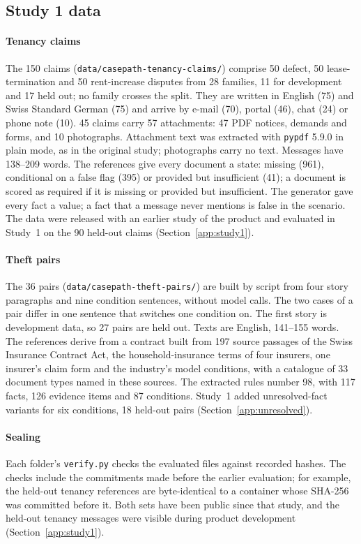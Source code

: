 \documentclass[acmsmall,screen,nonacm]{acmart}
\begin{document}
\subsection{Study 1 data}
\label{app:data-s1}

\paragraph{Tenancy claims}
The 150 claims (\texttt{data/\allowbreak{}casepath-tenancy-claims/}) comprise 50 defect, 50 lease-termination and 50 rent-increase disputes from 28 families, 11 for development and 17 held out; no family crosses the split. They are written in English (75) and Swiss Standard German (75) and arrive by e-mail (70), portal (46), chat (24) or phone note (10). 45 claims carry 57 attachments: 47 PDF notices, demands and forms, and 10 photographs. Attachment text was extracted with \texttt{pypdf} 5.9.0 in plain mode, as in the original study; photographs carry no text. Messages have 138--209 words. The references give every document a state: missing (961), conditional on a false flag (395) or provided but insufficient (41); a document is scored as required if it is missing or provided but insufficient. The generator gave every fact a value; a fact that a message never mentions is false in the scenario. The data were released with an earlier study of the product and evaluated in Study~1 on the 90 held-out claims (Section~\ref{app:study1}).

\paragraph{Theft pairs}
The 36 pairs (\texttt{data/\allowbreak{}casepath-theft-pairs/}) are built by script from four story paragraphs and nine condition sentences, without model calls. The two cases of a pair differ in one sentence that switches one condition on. The first story is development data, so 27 pairs are held out. Texts are English, 141--155 words. The references derive from a contract built from 197 source passages of the Swiss Insurance Contract Act, the household-insurance terms of four insurers, one insurer's claim form and the industry's model conditions, with a catalogue of 33 document types named in these sources. The extracted rules number 98, with 117 facts, 126 evidence items and 87 conditions. Study~1 added unresolved-fact variants for six conditions, 18 held-out pairs (Section~\ref{app:unresolved}).

\paragraph{Sealing}
Each folder's \texttt{verify.py} checks the evaluated files against recorded hashes. The checks include the commitments made before the earlier evaluation; for example, the held-out tenancy references are byte-identical to a container whose SHA-256 was committed before it. Both sets have been public since that study, and the held-out tenancy messages were visible during product development (Section~\ref{app:study1}).
\end{document}
